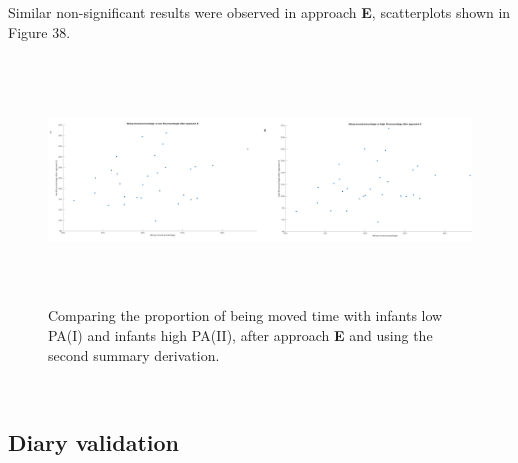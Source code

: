 \documentclass{article}
\begin{document}
{Similar non-significant results were observed in approach \textbf{E}, scatterplots shown in Figure 38. 
 \begin{figure}[h!]
\includegraphics[width=15cm, height=6.5cm]{IBM_vs_PA_E.png}
\caption{Comparing the proportion of being moved time with infants low PA(I) and infants high PA(II), after approach \textbf{E} and using the second summary derivation.}
\end{figure}
\\


\subsection{Diary validation}

}
\end{document}
